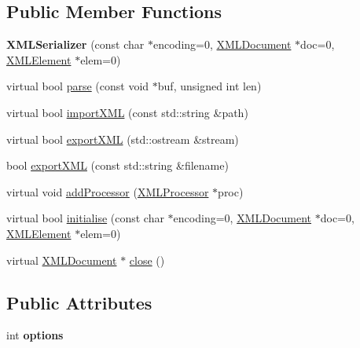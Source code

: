 \subsection*{Public Member Functions}
\begin{DoxyCompactItemize}
\item 
{\bfseries X\+M\+L\+Serializer} (const char $\ast$encoding=0, \hyperlink{classXMLDOM_1_1XMLDocument}{X\+M\+L\+Document} $\ast$doc=0, \hyperlink{classXMLDOM_1_1XMLElement}{X\+M\+L\+Element} $\ast$elem=0)\hypertarget{classXMLDOM_1_1XMLSerializer_ae08dc16c373e9ba73a3859598d5ed9fb}{}\label{classXMLDOM_1_1XMLSerializer_ae08dc16c373e9ba73a3859598d5ed9fb}

\item 
virtual bool \hyperlink{classXMLDOM_1_1XMLSerializer_abea28fce905d61d5b89c987f01808335}{parse} (const void $\ast$buf, unsigned int len)
\item 
virtual bool \hyperlink{classXMLDOM_1_1XMLSerializer_a2224aae579bed3aa406471e9f560c81b}{import\+X\+ML} (const std\+::string \&path)
\item 
virtual bool \hyperlink{classXMLDOM_1_1XMLSerializer_a195e26f4d238914c24b8e59347562fd3}{export\+X\+ML} (std\+::ostream \&stream)
\item 
bool \hyperlink{classXMLDOM_1_1XMLSerializer_aa0ac8b5d06367e14956be8db680b9f85}{export\+X\+ML} (const std\+::string \&filename)
\item 
virtual void \hyperlink{classXMLDOM_1_1XMLSerializer_aea081140e9fe48604e7b3824c8d9ecf4}{add\+Processor} (\hyperlink{classXMLDOM_1_1XMLProcessor}{X\+M\+L\+Processor} $\ast$proc)
\item 
virtual bool \hyperlink{classXMLDOM_1_1XMLSerializer_a24742822d98c992acb2332ce743353dc}{initialise} (const char $\ast$encoding=0, \hyperlink{classXMLDOM_1_1XMLDocument}{X\+M\+L\+Document} $\ast$doc=0, \hyperlink{classXMLDOM_1_1XMLElement}{X\+M\+L\+Element} $\ast$elem=0)
\item 
virtual \hyperlink{classXMLDOM_1_1XMLDocument}{X\+M\+L\+Document} $\ast$ \hyperlink{classXMLDOM_1_1XMLSerializer_a992f4314b31d6a76ca05cddf09dbf2a1}{close} ()
\end{DoxyCompactItemize}
\subsection*{Public Attributes}
\begin{DoxyCompactItemize}
\item 
int {\bfseries options}\hypertarget{classXMLDOM_1_1XMLSerializer_abf0c97479fbe7356737809a4108a3ec0}{}\label{classXMLDOM_1_1XMLSerializer_abf0c97479fbe7356737809a4108a3ec0}

\end{DoxyCompactItemize}


